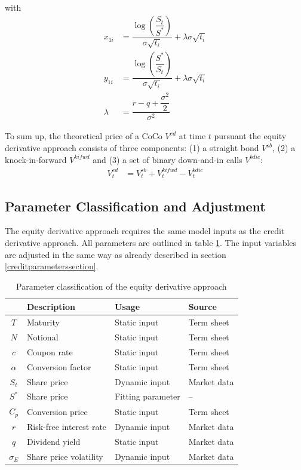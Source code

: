 with 
\begin{align*}
x_{1i} &= \dfrac{\log \left( \dfrac{S_t}{S^*} \right)}{\sigma \sqrt{t_i}} + \lambda \sigma \sqrt{t_i}\\
y_{1i} &= \dfrac{\log \left( \dfrac{S^*}{S_t} \right)}{\sigma \sqrt{t_i}} + \lambda \sigma \sqrt{t_i}\\
\lambda &= \dfrac{r-q+\dfrac{\sigma^2}{2}}{\sigma^2}
\end{align*}

To sum up, the theoretical price of a CoCo $V^{ed}$ at time $t$ pursuant the equity derivative approach consists of three components: (1) a straight bond $V^{sb}$, (2) a knock-in-forward $V^{kifwd}$ and (3) a set of binary down-and-in calls $V^{bdic}$:
\begin{align}
V^{ed}_t &= V^{sb}_t + V_t^{kifwd} - V_{t}^{bdic}
\end{align}

\subsection{Parameter Classification and Adjustment}

The equity derivative approach requires the same model inputs as the credit derivative approach. All parameters  are outlined in table \ref{equityparameters}. The input variables are adjusted in the same way as already described in section \ref{creditparameterssection}.

\begin{table}[H]
	\setlength{\extrarowheight}{2.5pt}
	\centering
	\begin{tabular}{clll}
		\toprule
			 & \textbf{Description} & \textbf{Usage} & \textbf{Source} \\ 
		\midrule
			$T$ & Maturity & Static input & Term sheet \\
			$N$ & Notional & Static input & Term sheet \\			
			$c$ & Coupon rate & Static input & Term sheet \\
			$\alpha$ & Conversion factor & Static input & Term sheet \\
			$S_t$ & Share price & Dynamic input & Market data \\
			$S^*$ & Share price & Fitting parameter & -- \\
			$C_p$ & Conversion price & Static input & Term sheet \\
			$r$ & Risk-free interest rate & Dynamic input & Market data \\
			$q$ & Dividend yield & Static input & Market data\\
			$\sigma_E$& Share price volatility & Dynamic input & Market data \\
		\bottomrule
	\end{tabular}
	\caption[Parameter classification of the equity derivative approach]{Parameter classification of the equity derivative approach \citep{wilkens2014contingent}}
	\label{equityparameters}
\end{table}

